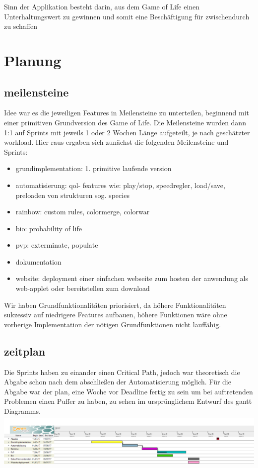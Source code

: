 \documentclass[12pt]{article}
\theoremstyle{plain}
\begin{document}
\begin{linenumbers}
Sinn der Applikation besteht darin, aus dem Game of Life einen Unterhaltungswert zu gewinnen und somit eine Beschäftigung für zwischendurch zu schaffen

\section{Planung}

\subsection{meilensteine}
Idee war es die jeweiligen Features in Meilensteine zu unterteilen, beginnend mit einer primitiven Grundversion des Game of Life. Die Meilensteine wurden dann 1:1 auf Sprints mit jeweils 1 oder 2 Wochen Länge aufgeteilt, je nach geschätzter workload.  Hier raus ergaben sich zunächst die folgenden Meilensteine und Sprints:
\begin{itemize}
\item
grundimplementation: 1. primitive laufende version
\item
automatisierung: qol- features wie: play/stop, speedregler, load/save, preloaden von strukturen sog. species
\item
rainbow: custom rules, colormerge, colorwar
\item
bio: probability of life
\item
pvp: exterminate, populate
\item
dokumentation
\item
website: deployment einer einfachen webseite zum hosten der anwendung als web-applet oder bereitstellen zum download
\end{itemize}

Wir haben Grundfunktionalitäten priorisiert, da höhere Funktionalitäten sukzessiv auf niedrigere Features aufbauen,
höhere Funktionen wäre ohne vorherige Implementation der nötigen Grundfunktionen nicht lauffähig.

\subsection{zeitplan}
Die Sprints haben zu einander einen Critical Path, jedoch war theoretisch die Abgabe schon nach dem abschließen der Automatisierung möglich.
Für die Abgabe war der plan, eine Woche vor Deadline fertig zu sein um bei auftretenden Problemen einen Puffer zu haben, zu sehen im ursprünglichem Entwurf des gantt Diagramms.
\newline
\includegraphics[width=1\textwidth, height=100px]{images/ganttdep.png}
\newline


\end{linenumbers}
\end{document}
